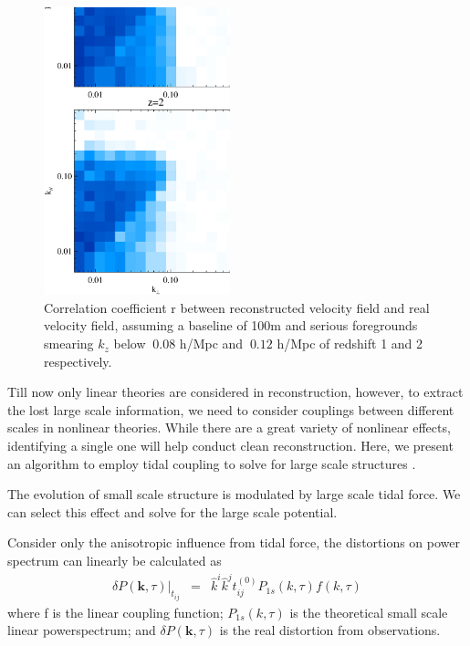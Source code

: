 \begin{figure}[tbp]
\begin{center}
\includegraphics[width=0.48\textwidth]{figure/powv2d_z1z2_r15r10.eps}
\end{center}
\vspace{-0.7cm}
    \caption{Correlation coefficient r between reconstructed velocity field and real velocity field, 
    assuming a baseline of 100m and serious foregrounds 
    smearing $k_z$ below $~0.08$ h/Mpc and $~0.12$ h/Mpc of redshift 1 and 2 respectively. 
}
\label{fig:v}
\end{figure}

Till now only linear theories are considered in reconstruction, 
however, to extract the lost large scale information, 
we need to consider couplings between different scales in nonlinear theories. 
While there are a great variety of nonlinear effects, 
identifying a single one will help conduct clean reconstruction.   
Here, we present an algorithm to employ 
tidal coupling 
to solve for large scale structures 
\cite{2015:zhu,2012:pen}.  

The evolution of small scale structure is modulated by large scale 
tidal force. We can select this effect and solve for the large scale potential. 

Consider only the anisotropic influence from tidal force, 
the distortions on power spectrum can linearly be calculated as  
\begin{eqnarray}
\label{eq:powerdistort}
\delta P(\bm{k},\tau)|_{t_{ij}}&=&
\hat{k}^i\hat{k}^jt_{ij}^{(0)}P_{1s}(k,\tau)f(k,\tau)
\end{eqnarray}
where f is the linear coupling function;
$P_{1s}(k,\tau)$ is the theoretical small scale linear powerspectrum; 
and $\delta P(\bm{k},\tau)$ is the real distortion from observations. 

